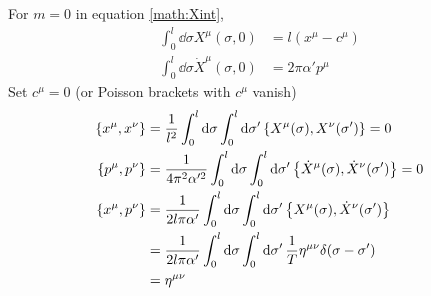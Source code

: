 For $m=0$ in equation \eqref{math:Xint},
\begin{align*}
	\int^l_0 \dd{\sigma}X^\mu (\sigma, 0)  &= l (x^\mu - c^\mu) \\
	\int^l_0 \dd{\sigma} \dot{X}^\mu (\sigma, 0)  &= 2\pi \alpha' p^\mu 
\end{align*}
Set $c^\mu = 0$ (or Poisson brackets with $c^\mu$ vanish)
\begin{align}
	\acomm{x^\mu}{x^\nu} &= \frac{1}{l^2} \int^l_0 \dd{\sigma} \int^l_0 \dd{\sigma'} \acomm{X^\mu(\sigma)}{X^\nu(\sigma')} = 0 \\
	\acomm{p^\mu}{p^\nu} &= \frac{1}{ 4 \pi^2 \alpha'^2} \int^l_0 \dd{\sigma} \int^l_0 \dd{\sigma'} \acomm{\dot{X}^\mu(\sigma)}{\dot{X}^\nu(\sigma')} = 0 \\
	\acomm{x^\mu}{p^\nu} &= \frac{1}{2l\pi\alpha'} \int^l_0 \dd{\sigma} \int^l_0 \dd{\sigma'} \acomm{X^\mu(\sigma)}{\dot{X}^\nu(\sigma')} \notag \\
								&=\frac{1}{2l\pi\alpha'} \int^l_0 \dd{\sigma} \int^l_0 \dd{\sigma'} \frac{1}{T} \eta^{\mu\nu} \delta(\sigma - \sigma') \notag \\
								&= \eta^{\mu\nu}
\end{align}
